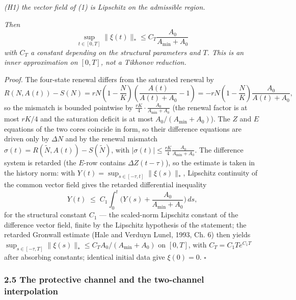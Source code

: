 \documentclass[11pt]{article}
\begin{document}
\emph{(H1) the vector field of (1) is Lipschitz on the admissible
region.}

\emph{Then}
\[\sup_{t \in [0,T]} \|\xi(t)\|_* \le C_T \frac{A_0}{A_{\min} + A_0}\]
\emph{with \(C_T\) a constant depending on the structural parameters and
\(T\). This is an inner approximation on \([0,T]\), not a Tikhonov
reduction.}

\emph{Proof.} The four-state renewal differs from the saturated renewal
by
\[R(N, A(t)) - S(N) = rN\left(1 - \frac{N}{K}\right)\left( \frac{A(t)}{A(t) + A_0} - 1 \right) = -rN\left(1 - \frac{N}{K}\right)\frac{A_0}{A(t) + A_0},\]
so the mismatch is bounded pointwise by
\(\frac{rK}{4} \cdot \frac{A_0}{A_{\min} + A_0}\) (the renewal factor is
at most \(rK/4\) and the saturation deficit is at most
\(A_0/(A_{\min} + A_0)\)). The \(Z\) and \(E\) equations of the two
cores coincide in form, so their difference equations are driven only by
\(\Delta N\) and by the renewal mismatch
\(\sigma(t) = R(\tilde N, A(t)) - S(\tilde N)\), with
\(|\sigma(t)| \le \frac{rK}{4} \frac{A_0}{A_{\min} + A_0}\). The
difference system is retarded (the \(E\)-row contains
\(\Delta Z(t - \tau)\)), so the estimate is taken in the history norm:
with \(Y(t) = \sup_{s \in [-\tau, t]} \|\xi(s)\|_*\), Lipschitz
continuity of the common vector field gives the retarded differential
inequality
\[Y(t) \;\le\; C_1 \int_0^t \Big( Y(s) + \frac{A_0}{A_{\min} + A_0} \Big)\, ds,\]
for the structural constant \(C_1\) --- the scaled-norm Lipschitz
constant of the difference vector field, finite by the Lipschitz
hypothesis of the statement; the retarded Gronwall estimate (Hale and
Verduyn Lunel, 1993, Ch. 6) then yields
\(\sup_{s \in [-\tau, T]} \|\xi(s)\|_* \le C_T A_0/(A_{\min} + A_0)\) on
\([0,T]\), with \(C_T = C_1 T e^{C_1 T}\) after absorbing constants;
identical initial data give \(\xi(0) = 0\). \ensuremath{\square}

\subsubsection{2.5 The protective channel and the two-channel
interpolation}\label{the-protective-channel-and-the-two-channel-interpolation}
\end{document}
